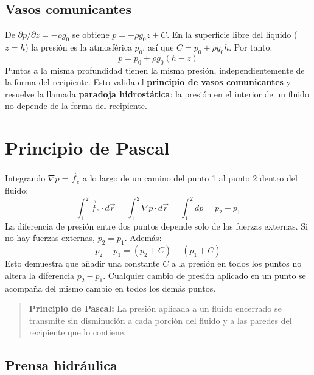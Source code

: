 \subsection{Vasos comunicantes}

De $\partial p/\partial z = -\rho g_0$ se obtiene $p = -\rho g_0 z + C$. En la superficie libre del líquido ($z = h$) la presión es la atmosférica $p_0$, así que $C = p_0 + \rho g_0 h$. Por tanto:
\begin{equation}
    p = p_0 + \rho g_0(h - z)
\end{equation}
Puntos a la misma profundidad tienen la misma presión, independientemente de la forma del recipiente. Esto valida el \textbf{principio de vasos comunicantes} y resuelve la llamada \textbf{paradoja hidrostática}: la presión en el interior de un fluido no depende de la forma del recipiente.

\section{Principio de Pascal}

Integrando $\nabla p = \vec{f}_e$ a lo largo de un camino del punto 1 al punto 2 dentro del fluido:
\begin{equation}
    \int_1^2 \vec{f}_e \cdot d\vec{r} = \int_1^2 \nabla p \cdot d\vec{r} = \int_1^2 dp = p_2 - p_1
\end{equation}
La diferencia de presión entre dos puntos depende solo de las fuerzas externas. Si no hay fuerzas externas, $p_2 = p_1$. Además:
\begin{equation}
    p_2 - p_1 = (p_2 + C) - (p_1 + C)
\end{equation}
Esto demuestra que añadir una constante $C$ a la presión en todos los puntos no altera la diferencia $p_2 - p_1$. Cualquier cambio de presión aplicado en un punto se acompaña del mismo cambio en todos los demás puntos.

\begin{quote}
\textbf{Principio de Pascal:} La presión aplicada a un fluido encerrado se transmite sin disminución a cada porción del fluido y a las paredes del recipiente que lo contiene.
\end{quote}

\subsection{Prensa hidráulica}

